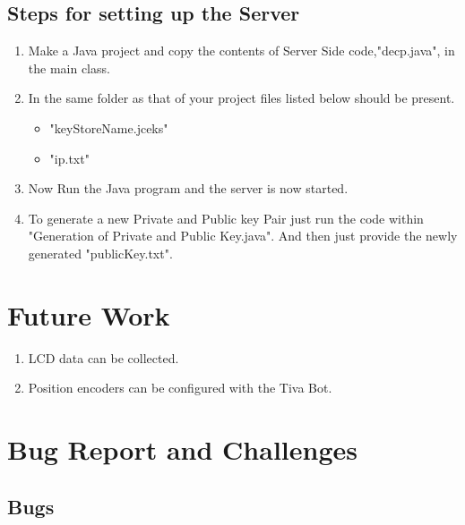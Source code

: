 \documentclass[a4paper,12pt,oneside]{book}
\begin{document}
\subsection{Steps for setting up the Server}
\begin{enumerate}

\item Make a Java project and copy the contents of Server Side code,"decp.java", in the main class. 
\item In the same folder as that of your project files listed below should be present.
	\begin{itemize} 
		\item "keyStoreName.jceks"
		\item "ip.txt"
	\end{itemize} 
\item Now Run the Java program and the server is now started.  
\item To generate a new Private and Public key Pair just run the code within "Generation of Private and Public Key.java". And then just provide the newly generated "publicKey.txt".

\end{enumerate}


\newpage

\section{Future Work}

\begin{enumerate}

\item LCD data can be collected.
\item Position encoders can be configured with the Tiva Bot.

\end{enumerate}

\newpage

\section{Bug Report and Challenges}

\subsection{Bugs}
\end{document}
